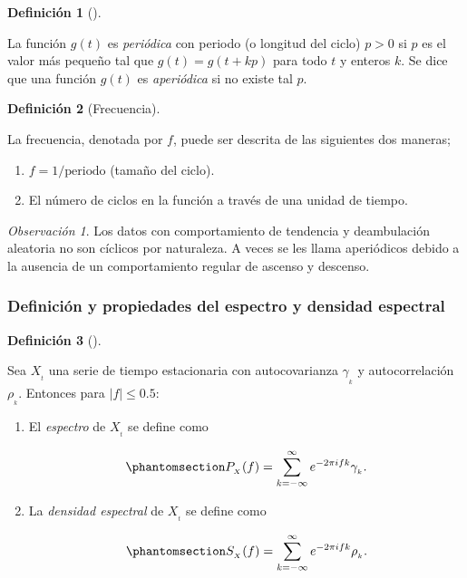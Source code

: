 \documentclass[
  us-letterpaper,
]{scrreprt}
\theoremstyle{plain}
\theoremstyle{definition}
\newtheorem{definition}{Definición}[chapter]
\theoremstyle{definition}
\theoremstyle{plain}
\theoremstyle{remark}
\newtheorem*{remark}{Observación}
\begin{document}
\begin{definition}[]\protect\hypertarget{def-aper}{}\label{def-aper}

La función \(g(t)\) es \emph{periódica} con periodo (o longitud del
ciclo) \(p > 0\) si \(p\) es el valor más pequeño tal que
\(g(t) = g(t + kp)\) para todo \(t\) y enteros \(k\). Se dice que una
función \(g(t)\) es \emph{aperiódica} si no existe tal \(p\).

\end{definition}

\begin{definition}[Frecuencia]\protect\hypertarget{def-freq}{}\label{def-freq}

La frecuencia, denotada por \(f\), puede ser descrita de las siguientes
dos maneras;

\begin{enumerate}
\def\labelenumi{\arabic{enumi}.}
\item
  \(f=1/\text{periodo}\) (tamaño del ciclo).
\item
  El número de ciclos en la función a través de una unidad de tiempo.
\end{enumerate}

\end{definition}

\begin{remark}
Los datos con comportamiento de tendencia y deambulación aleatoria no
son cíclicos por naturaleza. A veces se les llama aperiódicos debido a
la ausencia de un comportamiento regular de ascenso y descenso.
\end{remark}

\subsubsection{Definición y propiedades del espectro y densidad
espectral}\label{definiciuxf3n-y-propiedades-del-espectro-y-densidad-espectral}

\begin{definition}[]\protect\hypertarget{def-spec}{}\label{def-spec}

Sea \(X_{_t}\) una serie de tiempo estacionaria con autocovarianza
\(\gamma_{_k}\) y autocorrelación \(\rho_{_k}\). Entonces para
\(|f|\le 0.5\):

\begin{enumerate}
\def\labelenumi{\roman{enumi}.}
\item
  El \emph{espectro} de \(X_{_t}\) se define como

  \begin{equation}\phantomsection\label{eq-spectrum}{
  P_{_X}(f)=\sum_{k=-\infty}^\infty e^{-2\pi ifk}\gamma_{_k}.
  }\end{equation}
\item
  La \emph{densidad espectral} de \(X_{_t}\) se define como

  \begin{equation}\phantomsection\label{eq-spectden}{
  S_{_X}(f)=\sum_{k=-\infty}^\infty e^{-2\pi ifk}\rho_{_k}.
  }\end{equation}
\end{enumerate}

\end{definition}
\end{document}
